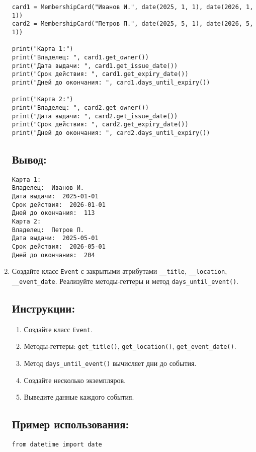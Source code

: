 \begin{enumerate}
\begin{lstlisting}[caption=Пример кода]
card1 = MembershipCard("Иванов И.", date(2025, 1, 1), date(2026, 1, 1))
card2 = MembershipCard("Петров П.", date(2025, 5, 1), date(2026, 5, 1))

print("Карта 1:")
print("Владелец: ", card1.get_owner())
print("Дата выдачи: ", card1.get_issue_date())
print("Срок действия: ", card1.get_expiry_date())
print("Дней до окончания: ", card1.days_until_expiry())

print("Карта 2:")
print("Владелец: ", card2.get_owner())
print("Дата выдачи: ", card2.get_issue_date())
print("Срок действия: ", card2.get_expiry_date())
print("Дней до окончания: ", card2.days_until_expiry())
\end{lstlisting}

\subsection*{Вывод:}
\begin{lstlisting}[caption=Ожидаемый вывод]
Карта 1:
Владелец:  Иванов И.
Дата выдачи:  2025-01-01
Срок действия:  2026-01-01
Дней до окончания:  113
Карта 2:
Владелец:  Петров П.
Дата выдачи:  2025-05-01
Срок действия:  2026-05-01
Дней до окончания:  204
\end{lstlisting}

\item
Создайте класс \texttt{Event} с закрытыми атрибутами \texttt{\_\_title}, \texttt{\_\_location}, \texttt{\_\_event\_date}. Реализуйте методы-геттеры и метод \texttt{days\_until\_event()}.

\subsection*{Инструкции:}
\begin{enumerate}
    \item Создайте класс \texttt{Event}.
    \item Методы-геттеры: \texttt{get\_title()}, \texttt{get\_location()}, \texttt{get\_event\_date()}.
    \item Метод \texttt{days\_until\_event()} вычисляет дни до события.
    \item Создайте несколько экземпляров.
    \item Выведите данные каждого события.
\end{enumerate}

\subsection*{Пример использования:}
\begin{lstlisting}[caption=Пример кода]
from datetime import date


\end{lstlisting}
\end{enumerate}
